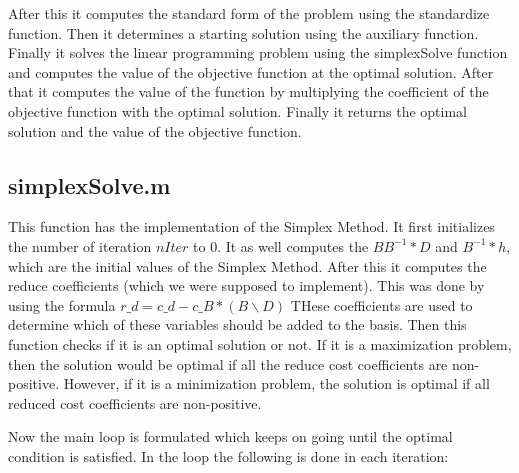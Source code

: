 \documentclass[unicode,11pt,a4paper,oneside,numbers=endperiod,openany]{scrartcl}
\begin{document}
After this it computes the standard form of the problem using the standardize function. Then it determines a starting solution using the auxiliary function. Finally it solves the linear programming problem using the simplexSolve function and computes the value of the objective function at the optimal solution. After that it computes the value of the function by multiplying the coefficient of the objective function with the optimal solution. Finally it returns the optimal solution and the value of the objective function.

\subsection{simplexSolve.m}

This function has the implementation of the Simplex Method. It first initializes the number of iteration $nIter$ to $0$. It as well computes the $BB^{-1}*D$ and $B^{-1}*h$, which are the initial values of the Simplex Method. After this it computes the reduce coefficients (which we were supposed to implement). This was done by using the formula $r\_d = c\_d - c\_B * (B \backslash D)$ THese coefficients are used to determine which of these variables should be added to the basis. Then this function checks if it is an optimal solution or not. If it is a maximization problem, then the solution would be optimal if all the reduce cost coefficients are non-positive. However, if it is a minimization problem, the solution is optimal if all reduced cost coefficients are non-positive. 

Now the main loop is formulated which keeps on going until the optimal condition is satisfied. In the loop the following is done in each iteration:
\end{document}
